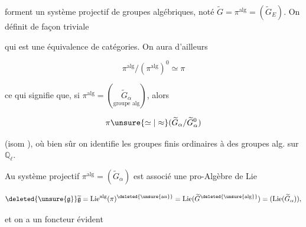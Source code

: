 forment un système projectif de groupes algébriques, noté $\widetilde G=\pi^{\mathrm{alg}}=(\widetilde G_E)$. On définit de façon triviale


qui est une équivalence de catégories. On aura d'ailleurs

\[
\pi^{\mathrm{alg}}/(\pi^{\mathrm{alg}})^0\simeq\pi
\]

ce qui signifie que, si $\pi^{\mathrm{alg}}=(\underset{\text{groupe alg}}{\widetilde G_\alpha})$, alors

\[
\pi\unsure{\simeq|\approx}(\widetilde G_\alpha/\widetilde G_\alpha^0)
\]

(isom ), où bien sûr on identifie les groupes finis ordinaires à des groupes alg. sur $\mathbb Q_\ell$.

 Au système projectif $\pi^{\mathrm{alg}}=(\widetilde G_\alpha)$ est associé une pro-Algèbre de Lie

\[
\deleted{\unsure{\mathfrak g}}\widetilde{\mathfrak g}=\operatorname{Lie}^{\mathrm{alg}}(\pi)^{\deleted{\unsure{\mathrm{an}}}}=\operatorname{Lie}(\widetilde G^{\deleted{\unsure{\mathrm{alg}}}})=(\operatorname{Lie}(\widetilde G_\alpha)),
\]

et on  a un foncteur évident

